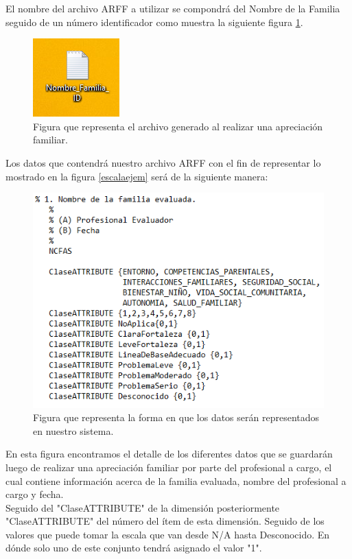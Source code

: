 El nombre del archivo ARFF a utilizar se compondrá del Nombre de la Familia seguido de un número identificador como muestra la siguiente figura \ref{archivo}. 

\begin{figure}[h!]
	\label{archivo}
	\begin{center}
		\includegraphics[scale=0.3]{imagenes/archivo.png}
		\caption{Figura que representa el archivo generado al realizar una apreciación familiar.}
	\end{center}
\end{figure}

Los datos que contendrá nuestro archivo ARFF con el fin de representar lo mostrado en la figura \ref{escalaejem} será de la siguiente manera:

\begin{figure}[h!]
	\label{cabecera}
	\begin{center}
		\includegraphics[scale=0.4]{imagenes/cabecera.png}
		\caption{Figura que representa la forma en que los datos serán representados en nuestro sistema.}
	\end{center}
\end{figure}



En esta figura encontramos el detalle de los diferentes datos que se guardarán luego de realizar una apreciación familiar por parte del profesional a cargo, el cual contiene información acerca de la familia evaluada, nombre del profesional a cargo y fecha.\\ Seguido del "ClaseATTRIBUTE" de la dimensión posteriormente "ClaseATTRIBUTE" del número del ítem de esta dimensión. Seguido de los valores que puede tomar la escala que van desde N/A hasta Desconocido. En dónde solo uno de este conjunto tendrá asignado el valor "1".\\

